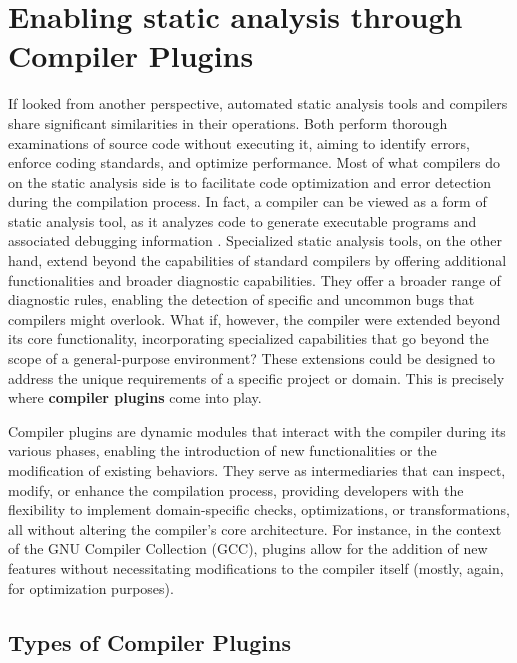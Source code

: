 \documentclass[12pt,a4paper,openright,twoside]{book}
\begin{document}

\section{Enabling static analysis through Compiler Plugins}

If looked from another perspective, automated static analysis tools and
compilers share significant similarities in their operations. Both perform
thorough examinations of source code without executing it, aiming to identify
errors, enforce coding standards, and optimize performance. Most of what
compilers do on the static analysis side is to facilitate code optimization and
error detection during the compilation process. In fact, a compiler can be
viewed as a form of static analysis tool, as it analyzes code to generate
executable programs and associated debugging information
\cite{DBLP:journals/queue/Thomson21}.
%
Specialized static analysis tools, on the other hand, extend beyond the
capabilities of standard compilers by offering additional functionalities and
broader diagnostic capabilities. They offer a broader range of diagnostic rules,
enabling the detection of specific and uncommon bugs that compilers might
overlook.
%
What if, however, the compiler were extended beyond its core functionality,
incorporating specialized capabilities that go beyond the scope of a
general-purpose environment? These extensions could be designed to address the
unique requirements of a specific project or domain. This is precisely where
\textbf{compiler plugins} come into play.

Compiler plugins are dynamic modules that interact with the compiler during its
various phases, enabling the introduction of new functionalities or the
modification of existing behaviors. They serve as intermediaries that can
inspect, modify, or enhance the compilation process, providing developers with
the flexibility to implement domain-specific checks, optimizations, or
transformations, all without altering the compiler's core architecture. 
%
For instance, in the context of the GNU Compiler Collection
(GCC), plugins allow for the addition of new features without necessitating
modifications to the compiler itself (mostly, again, for optimization purposes).

\subsection{Types of Compiler Plugins}
\end{document}
